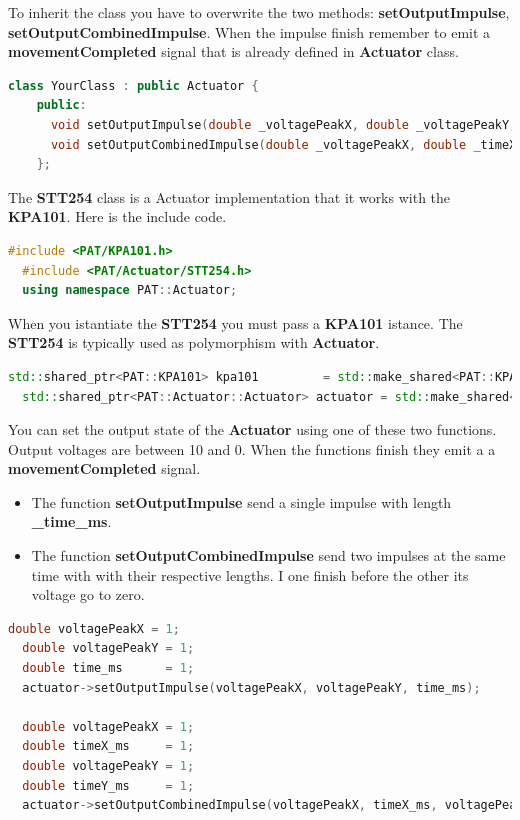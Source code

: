 To inherit the class you have to overwrite the two methods:
\textbf{setOutputImpulse}, \textbf{setOutputCombinedImpulse}. When the
impulse finish remember to emit a \textbf{movementCompleted} signal that
is already defined in \textbf{Actuator} class.

\begin{lstlisting}[language=c++, gobble=2]
  class YourClass : public Actuator {
    public:
      void setOutputImpulse(double _voltagePeakX, double _voltagePeakY, double _time_ms) override;
      void setOutputCombinedImpulse(double _voltagePeakX, double _timeX_ms, double _voltagePeakY, double _timeY_ms) override;
    };
\end{lstlisting}


The \textbf{STT254} class is a Actuator implementation that it works with
the \textbf{KPA101}. Here is the include code.

\begin{lstlisting}[language=c++, gobble=2]
  #include <PAT/KPA101.h>
  #include <PAT/Actuator/STT254.h>
  using namespace PAT::Actuator;
\end{lstlisting}

When you istantiate the \textbf{STT254} you must pass a \textbf{KPA101}
istance. The \textbf{STT254} is typically used as polymorphism with
\textbf{Actuator}.

\begin{lstlisting}[language=c++, gobble=2]
  std::shared_ptr<PAT::KPA101> kpa101         = std::make_shared<PAT::KPA101>();
  std::shared_ptr<PAT::Actuator::Actuator> actuator = std::make_shared<PAT::Actuator::STT254>(kpa101);
\end{lstlisting}

You can set the output state of the \textbf{Actuator} using one of these
two functions. Output voltages are between 10 and 0. When the functions
finish they emit a a \textbf{movementCompleted} signal.

\begin{itemize}
  \tightlist
  \item
        The function \textbf{setOutputImpulse} send a single impulse with
        length \textbf{\_time\_ms}.
  \item
        The function \textbf{setOutputCombinedImpulse} send two impulses at
        the same time with with their respective lengths. I one finish before
        the other its voltage go to zero.
\end{itemize}

\begin{lstlisting}[language=c++, gobble=2]
  double voltagePeakX = 1;
  double voltagePeakY = 1;
  double time_ms      = 1;
  actuator->setOutputImpulse(voltagePeakX, voltagePeakY, time_ms);
  
  double voltagePeakX = 1;
  double timeX_ms     = 1;
  double voltagePeakY = 1;
  double timeY_ms     = 1;
  actuator->setOutputCombinedImpulse(voltagePeakX, timeX_ms, voltagePeakY, timeY_ms);
\end{lstlisting}


